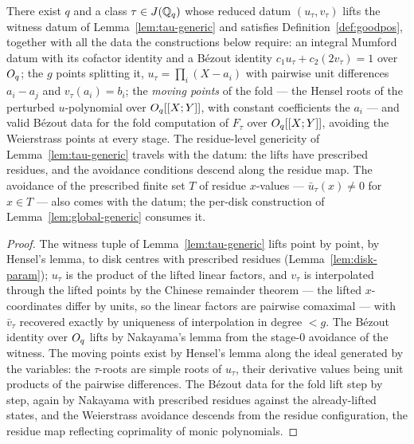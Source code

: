 \begin{lemma}
\label{lem:tau-exists}
\leanok
{}
There exist $q$ and a class $\tau \in J(\mathbb{Q}_q)$ whose reduced datum $(u_\tau, v_\tau)$
lifts the witness datum of Lemma~\ref{lem:tau-generic} and satisfies
Definition~\ref{def:goodpos}, together with all the data the constructions below
require: an integral Mumford datum with its cofactor identity and a B\'ezout identity
$c_1 u_\tau + c_2 (2 v_\tau) = 1$ over $O_q$; the $g$ points splitting it,
$u_\tau = \prod_i (X - a_i)$ with pairwise unit differences $a_i - a_j$ and
$v_\tau(a_i) = b_i$; the \emph{moving points} of the fold --- the Hensel roots of the
perturbed $u$-polynomial over $O_q[[X;Y]]$, with constant coefficients the $a_i$ ---
and valid B\'ezout data for the fold computation of $F_\tau$ over $O_q[[X;Y]]$,
avoiding the Weierstrass points at every stage. The residue-level genericity of
Lemma~\ref{lem:tau-generic} travels with the datum: the lifts have prescribed residues,
and the avoidance conditions descend along the residue map. The avoidance of the
prescribed finite set $T$ of residue $x$-values --- $\bar u_\tau(x) \neq 0$ for
$x \in T$ --- also comes with the datum; the per-disk construction of
Lemma~\ref{lem:global-generic} consumes it.
\end{lemma}
\begin{proof}
\leanok
The witness tuple of Lemma~\ref{lem:tau-generic} lifts point by point, by Hensel's
lemma, to disk centres with prescribed residues (Lemma~\ref{lem:disk-param}); $u_\tau$
is the product of the lifted linear factors, and $v_\tau$ is interpolated through the
lifted points by the Chinese remainder theorem --- the lifted $x$-coordinates differ by
units, so the linear factors are pairwise comaximal --- with $\bar v_\tau$ recovered
exactly by uniqueness of interpolation in degree $< g$. The B\'ezout identity over
$O_q$ lifts by Nakayama's lemma from the stage-$0$ avoidance of the witness. The moving
points exist by Hensel's lemma along the ideal generated by the variables: the
$\tau$-roots are simple roots of $u_\tau$, their derivative values being unit products
of the pairwise differences. The B\'ezout data for the fold lift step by step, again by
Nakayama with prescribed residues against the already-lifted states, and the
Weierstrass avoidance descends from the residue configuration, the residue map
reflecting coprimality of monic polynomials.
\end{proof}


